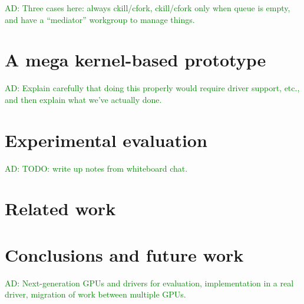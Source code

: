 \documentclass[nocopyrightspace]{sigplanconf-pldi16}
\newcommand{\ADComment}[1]{\textcolor{green}{AD: #1}}
\begin{document}
\ADComment{Three cases here: always ckill/cfork, ckill/cfork only when
  queue is empty, and have a ``mediator'' workgroup to manage things.}


\section{A mega kernel-based prototype}

\ADComment{Explain carefully that doing this properly would require
  driver support, etc., and then explain what we've actually done.}


\section{Experimental evaluation}

\ADComment{TODO: write up notes from whiteboard chat.}


\section{Related work}

\section{Conclusions and future work}

\ADComment{Next-generation GPUs and drivers for evaluation,
  implementation in a real driver, migration of work between multiple
  GPUs.}
\end{document}
